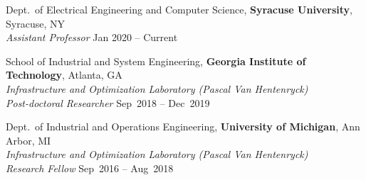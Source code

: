 


\beginTitleList
	\item
	Dept.~of Electrical Engineering and Computer Science, 
	{\bf Syracuse University}, Syracuse, NY\\
	{\em Assistant Professor} \hfill{Jan 2020 -- Current}


	\item 
	School of Industrial and System Engineering, 
	{\bf Georgia Institute of Technology}, Atlanta, GA \\
	{\em Infrastructure and Optimization Laboratory (Pascal Van Hentenryck)}\\
	{\em Post-doctoral Researcher} \hfill{Sep~2018 -- Dec~2019}

	\item
	Dept.~of Industrial and Operations Engineering,  
	{\bf University of Michigan}, Ann Arbor, MI \\
	{\em Infrastructure and Optimization Laboratory (Pascal Van Hentenryck)}\\
	{\em Research Fellow} \hfill{Sep~2016 -- Aug~2018}


\endTitleList
